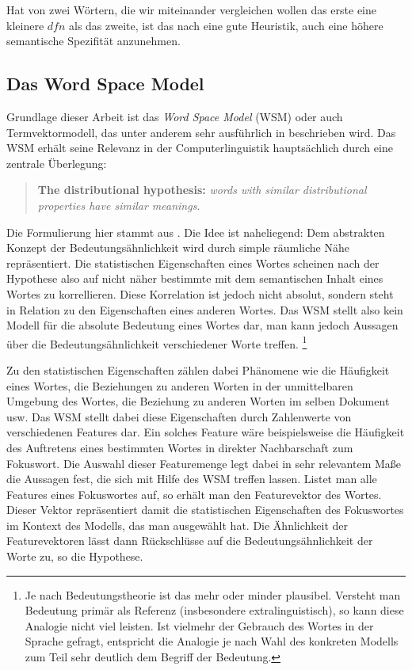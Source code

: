 \documentclass[11pt,numbers=noenddot]{scrartcl}
\begin{document}
Hat von zwei Wörtern, die wir miteinander vergleichen wollen das erste eine kleinere $dfn$ als das zweite, ist das nach \citet{Caraballo99determiningthe} eine gute Heuristik, auch eine höhere semantische Spezifität anzunehmen.

\subsection{Das Word Space Model}
Grundlage dieser Arbeit ist das \emph{Word Space Model} (WSM) oder auch Termvektormodell, das unter anderem sehr ausführlich in \citet{sahlgren2006word} beschrieben wird. Das WSM erhält seine Relevanz in der Computerlinguistik hauptsächlich durch eine zentrale Überlegung:
\begin{quote}
    \textbf{The distributional hypothesis:} \emph{words with similar distributional properties have similar meanings.}
\end{quote}
Die Formulierung hier stammt aus \citet[S. 21]{sahlgren2006word}. Die Idee ist naheliegend: Dem abstrakten Konzept der Bedeutungsähnlichkeit wird durch simple räumliche Nähe repräsentiert. Die statistischen Eigenschaften eines Wortes scheinen nach der Hypothese also auf nicht näher bestimmte mit dem semantischen Inhalt eines Wortes zu korrellieren. Diese Korrelation ist jedoch nicht absolut, sondern steht in Relation zu den Eigenschaften eines anderen Wortes. Das WSM stellt also kein Modell für die absolute Bedeutung eines Wortes dar, man kann jedoch Aussagen über die Bedeutungsähnlichkeit verschiedener Worte treffen. \footnote{Je nach Bedeutungstheorie ist das mehr oder minder plausibel. Versteht man Bedeutung primär als Referenz (insbesondere extralinguistisch), so kann diese Analogie nicht viel leisten. Ist vielmehr der Gebrauch des Wortes in der Sprache gefragt, entspricht die Analogie je nach Wahl des konkreten Modells zum Teil sehr deutlich dem Begriff der Bedeutung.}

Zu den statistischen Eigenschaften zählen dabei Phänomene wie die Häufigkeit eines Wortes, die Beziehungen zu anderen Worten in der unmittelbaren Umgebung des Wortes, die Beziehung zu anderen Worten im selben Dokument usw. Das WSM stellt dabei diese Eigenschaften durch Zahlenwerte von verschiedenen Features dar. Ein solches Feature wäre beispielsweise die Häufigkeit des Auftretens eines bestimmten Wortes in direkter Nachbarschaft zum Fokuswort. Die Auswahl dieser Featuremenge legt dabei in sehr relevantem Maße die Aussagen fest, die sich mit Hilfe des WSM treffen lassen. Listet man alle Features eines Fokuswortes auf, so erhält man den Featurevektor des Wortes. Dieser Vektor repräsentiert damit die statistischen Eigenschaften des Fokuswortes im Kontext des Modells, das man ausgewählt hat. Die Ähnlichkeit der Featurevektoren lässt dann Rückschlüsse auf die Bedeutungsähnlichkeit der Worte zu, so die Hypothese.
\end{document}
